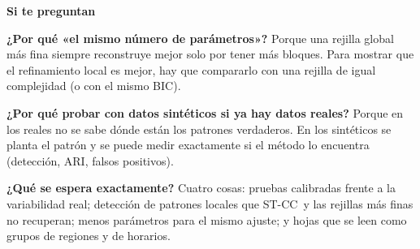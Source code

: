 \documentclass[11pt,a4paper]{article}
\newcommand{\cajainicio}[3]{\par\medskip\noindent
  \begin{lrbox}{\cajabox}\begin{minipage}{\dimexpr\linewidth-2\fboxsep-2\fboxrule\relax}%
  \textbf{\color{#1}#3}\par\smallskip}
\newcommand{\cajafin}[2]{\end{minipage}\end{lrbox}\fcolorbox{#1}{#2}{\usebox{\cajabox}}\par\medskip}
\newenvironment{nota}[1]{\cajainicio{acc}{acc!7}{#1}}{\cajafin{acc}{acc!7}}
\newcommand{\STCC}{ST-CC}
\begin{document}
\begin{nota}{Si te preguntan}
\textbf{¿Por qué «el mismo número de parámetros»?} Porque una rejilla global más fina siempre reconstruye mejor solo por tener más bloques. Para mostrar que el refinamiento local es mejor, hay que compararlo con una rejilla de igual complejidad (o con el mismo BIC).

\textbf{¿Por qué probar con datos sintéticos si ya hay datos reales?} Porque en los reales no se sabe dónde están los patrones verdaderos. En los sintéticos se planta el patrón y se puede medir exactamente si el método lo encuentra (detección, ARI, falsos positivos).

\textbf{¿Qué se espera exactamente?} Cuatro cosas: pruebas calibradas frente a la variabilidad real; detección de patrones locales que \STCC\ y las rejillas más finas no recuperan; menos parámetros para el mismo ajuste; y hojas que se leen como grupos de regiones y de horarios.
\end{nota}
\end{document}
